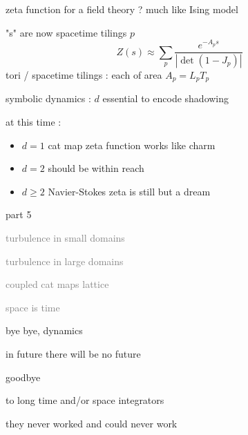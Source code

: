 

\begin{frame}{zeta function for a field theory ? much like Ising model}
\begin{block}{"\po s" are now spacetime tilings $p$}
\[
Z(s) \approx
\sum_{p} \frac{e^{-A_p s}}
              {\left|\det(1-J_p)\right|}
\]
tori / spacetime tilings :
each of area $A_p = L_p T_p$
\end{block}
\begin{block}{symbolic dynamics : $d$\dmn}
essential to encode shadowing
\end{block}

\vfill
at this time :
\begin{itemize}
\item $d=1$ cat map zeta function works like charm
\item $d=2$ {\catLatt} should be within reach
\item $d\geq2$ Navier-Stokes  zeta is still but a dream
\end{itemize}
\end{frame}

\begin{frame}{part 5}
\begin{enumerate}
              \item
    \textcolor{gray}{\small
turbulence in small domains
              \item
turbulence in large domains
              \item
coupled cat maps lattice
              \item
space is time
    }
              \item
    {\Large
bye bye, dynamics
    }
            \end{enumerate}
\end{frame}

\begin{frame}{in future there will be no future}
\begin{center}
{\huge goodbye}
\end{center}

\vfill

to long time and/or space integrators

\medskip

\hfill they never worked and could never work
\end{frame}

